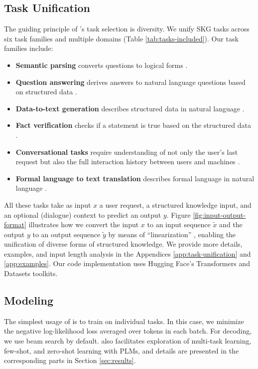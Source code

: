 \subsection{Task Unification}
\label{subsec:task_unification}
The guiding principle of \uskg{}'s task selection is diversity. We unify \ntasks SKG tasks across six task families and multiple domains (Table \ref{tab:tasks-included}). Our task families include:
\begin{itemize}[leftmargin=*]
    \item \textbf{Semantic parsing} converts questions to logical forms \cite{ZelleM96,Zettlemoyer05}.
    \item \textbf{Question answering} derives answers to natural language questions based on structured data \cite{BerantCFL13}.
    \item \textbf{Data-to-text generation} describes structured data in natural language \cite{NovikovaDR17}.
    \item \textbf{Fact verification} checks if a statement is true based on the structured data \cite{2019TabFactA}.
    \item \textbf{Conversational tasks} require understanding of not only the user's last request but also the full interaction history between users and machines \cite{budzianowski2018large, eric2019multiwoz, yu-etal-2019-cosql}.
    \item \textbf{Formal language to text translation} describes formal language in natural language \cite{chen-etal-2020-logic2text}. 
\end{itemize}

All these tasks take as input $x$ a user request, a structured knowledge input, and an optional (dialogue) context to predict an output $y$.
Figure \ref{fig:input-output-format} illustrates how we convert the input $x$ to an input sequence $\tilde{x}$ and the output $y$ to an output sequence $\tilde{y}$ by means of ``linearization'' \cite{liu2021tapex}, enabling the unification of diverse forms of structured knowledge. We provide more details, examples, and input length analysis in the Appendices \ref{app:task-unification} and \ref{app:examples}.
Our code implementation uses Hugging Face's Transformers \cite{wolf-etal-2020-transformers} and Datasets \cite{lhoest2021datasets} toolkits. 

\subsection{Modeling}
The simplest usage of \uskg is to train on individual tasks. In this case, we minimize the negative log-likelihood loss averaged over tokens in each batch. 
For decoding, we use beam search by default.
\uskg also facilitates exploration of multi-task learning, few-shot, and zero-shot learning with PLMs, and details are presented in the corresponding parts in Section \ref{sec:results}. 

